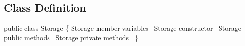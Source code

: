 \documentclass{article}
\def\nwendcode{\endtrivlist \endgroup}      %
\let\nwdocspar=\par
\theoremstyle{definition}                   %
\begin{document}
\subsection{Class Definition}
\label{sec:class-definition}
\nwenddocs{}\endmoddef{}
public class Storage \{
  \LA{}\code{}Storage\edoc{} member variables~{\nwtagstyle{}}\RA{}
  \LA{}\code{}Storage\edoc{} constructor~{\nwtagstyle{}}\RA{}
  \LA{}\code{}Storage\edoc{} public methods~{\nwtagstyle{}}\RA{}
  \LA{}\code{}Storage\edoc{} private methods~{\nwtagstyle{}}\RA{}
\}
\nwendcode{}\nwdocspar
\end{document}

